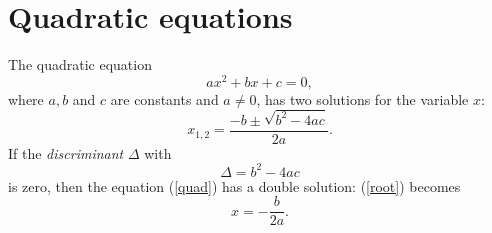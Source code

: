 \documentclass{article}
\begin{document}
\section*{Quadratic equations}
The quadratic equation
\begin{equation}
  \label{quad}
  ax^2 + bx + c = 0,
\end{equation}
where \( a, b \) and \( c \) are constants and \( a \neq 0 \),
has two solutions for the variable \( x \):
\begin{equation}
  \label{root}
  x_{1,2} = \frac{-b \pm \sqrt{b^2-4ac}}{2a}. 
\end{equation}
If the \emph{discriminant} \( \Delta \) with
\[
  \Delta = b^2 - 4ac
\]
is zero, then the equation (\ref{quad}) has a double solution:
(\ref{root}) becomes
\[
  x = - \frac{b}{2a}.
\]
\end{document}
